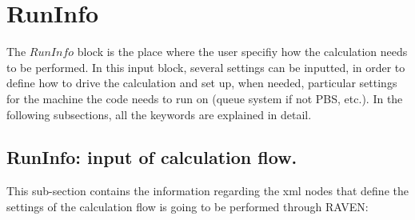 \section{RunInfo  \\ \vspace{2 mm} {\small }}
The $RunInfo$ block is the place where the user specifiy how the calculation needs to be performed. In this input block, several settings can be inputted, in order to define how to drive the calculation and set up, when needed, particular settings for the machine the code needs to run on (queue system if not PBS, etc.).
In the following subsections, all the keywords are explained in detail.

\subsection{RunInfo: input of calculation flow.}
\label{subsec:runinfoCalcFlow}
This sub-section contains the information regarding the xml nodes that define the settings of the calculation flow is going to be performed through RAVEN:

